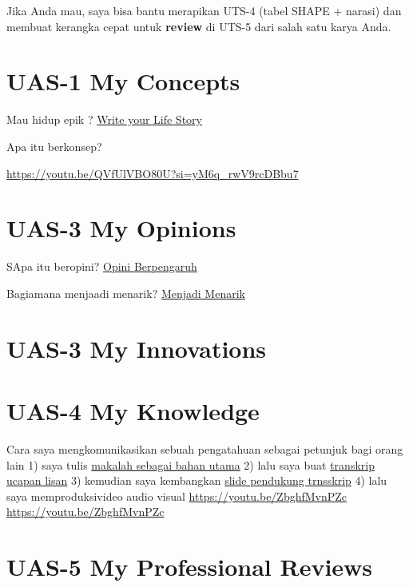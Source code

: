 \documentclass[
  letterpaper,
  DIV=11,
  numbers=noendperiod]{scrreprt}
\begin{document}
Jika Anda mau, saya bisa bantu merapikan UTS-4 (tabel SHAPE + narasi)
dan membuat kerangka cepat untuk \textbf{review} di UTS-5 dari salah
satu karya Anda.


\chapter{UAS-1 My Concepts}\label{uas-1-my-concepts}

Mau hidup epik ? \href{lifestory.pdf}{Write your Life Story}

Apa itu berkonsep?

\url{https://youtu.be/QVfUlVBO80U?si=yM6q_rwV9rcDBbu7}


\chapter{UAS-3 My Opinions}\label{uas-3-my-opinions}

SApa itu beropini? \href{BM\%20Opini.mp4}{Opini Berpengaruh}

Bagiamana menjaadi menarik? \href{./Interesting.mp4}{Menjadi Menarik}


\chapter{UAS-3 My Innovations}\label{uas-3-my-innovations}


\chapter{UAS-4 My Knowledge}\label{uas-4-my-knowledge}

Cara saya mengkomunikasikan sebuah pengatahuan sebagai petunjuk bagi
orang lain 1) saya tulis
\href{Rekomendasi\%20Presentasi\%20Efektif(Contoh\%20Makalah).pdf}{makalah
sebagai bahan utama} 2) lalu saya buat
\href{Contoh\%20Transkrip\%20Presentasi.pdf}{transkrip ucapan lisan} 3)
kemudian saya kembangkan
\href{Rekomendasi\%20Presentasi\%20(Contoh\%20Slides).pdf}{slide
pendukung trnsskrip} 4) lalu saya memproduksivideo audio visual
\url{https://youtu.be/ZbghfMvnPZc} \url{https://youtu.be/ZbghfMvnPZc}


\chapter{UAS-5 My Professional
Reviews}\label{uas-5-my-professional-reviews}
\end{document}
